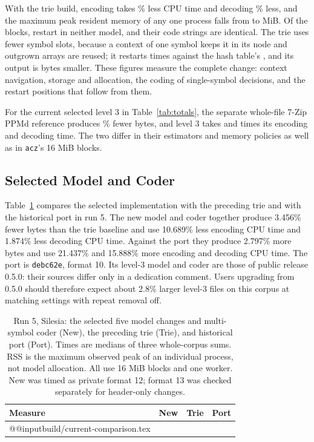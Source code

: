 \documentclass[10pt,letterpaper]{article}
\newcommand{\acz}{\texttt{acz}}
\newcommand{\code}[1]{\texttt{#1}}
\begin{document}
With the trie build, encoding takes \TrieEncodeReduction{}\% less CPU time and decoding \TrieDecodeReduction{}\% less, and the maximum peak resident memory of any one process falls from \TrieRssHash{} to \TrieRss{} MiB. Of the \TreeBlocks{} blocks, \TreeQuietBlocks{} restart in neither model, and their code strings are identical. The trie uses fewer symbol slots, because a context of one symbol keeps it in its node and outgrown arrays are reused; it restarts \TreeRestarts{} times against the hash table's \TreeHashRestarts{}, and its output is \TrieBytesSaved{} bytes smaller. These figures measure the complete change: context navigation, storage and allocation, the coding of single-symbol decisions, and the restart positions that follow from them.

For the current selected level 3 in Table~\ref{tab:totals}, the separate whole-file 7-Zip PPMd reference produces \PpmRefSmaller{}\% fewer bytes, and level 3 takes \PpmRefEncodeRatio{} and \PpmRefDecodeRatio{} times its encoding and decoding time. The two differ in their estimators and memory policies as well as in \acz{}'s 16 MiB blocks.

\subsection{Selected Model and Coder}\label{sec:current}
Table~\ref{tab:current} compares the selected implementation with the preceding trie and with the historical port in run 5. The new model and coder together produce 3.456\% fewer bytes than the trie baseline and use 10.689\% less encoding CPU time and 1.874\% less decoding CPU time. Against the port they produce 2.797\% more bytes and use 21.437\% and 15.888\% more encoding and decoding CPU time. The port is \code{debc62e}, format 10. Its level-3 model and coder are those of public release 0.5.0: their sources differ only in a dedication comment. Users upgrading from 0.5.0 should therefore expect about 2.8\% larger level-3 files on this corpus at matching settings with repeat removal off.

\begin{table}[htbp]
\centering
\caption{Run 5, Silesia: the selected five model changes and multi-symbol coder (New), the preceding trie (Trie), and historical port (Port). Times are medians of three whole-corpus sums. RSS is the maximum observed peak of an individual process, not model allocation. All use 16 MiB blocks and one worker. New was timed as private format 12; format 13 was checked separately for header-only changes.}\label{tab:current}
\medskip
\small
\begin{tabular}{@{}lrrr@{}}
\toprule
Measure & New & Trie & Port\\
\midrule
\csname @@input\endcsname build/current-comparison.tex
\bottomrule
\end{tabular}
\end{table}
\end{document}
